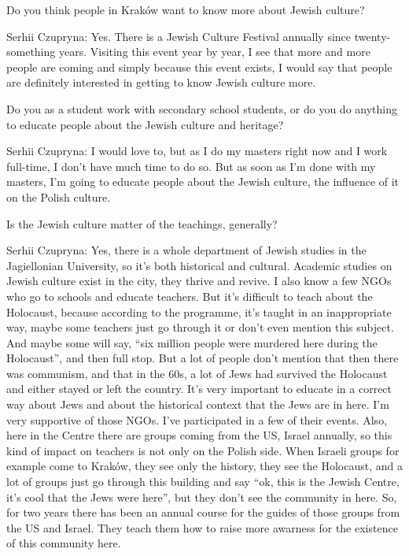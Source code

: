  Do you think people in Kraków want to know more about Jewish culture? 

Serhii Czupryna: Yes. There is a Jewish Culture Festival annually since twenty-something years. Visiting this event year by year, I see that more and more people are coming and simply because this event exists, I would say that people are definitely interested in getting to know Jewish culture more.  

Do you as a student work with secondary school students, or do you do anything to educate people about the Jewish culture and heritage? 

Serhii Czupryna: I would love to, but as I do my masters right now and I work full-time, I don’t have much time to do so. But as soon as I’m done with my masters, I’m going to educate people about the Jewish culture, the influence of it on the Polish culture. 

Is the Jewish culture matter of the teachings, generally? 

Serhii Czupryna: Yes, there is a whole department of Jewish studies in the Jagiellonian University, so it’s both historical and cultural. Academic studies on Jewish culture exist in the city, they thrive and revive.  
I also know a few NGOs who go to schools and educate teachers. But it’s difficult to teach about the Holocaust, because according to the programme, it’s taught in an inappropriate way, maybe some teachers just go through it or don’t even mention this subject. And maybe some will say, “six million people were murdered here during the Holocaust”, and then full stop. But a lot of people don’t mention that then there was communism, and that in the 60s, a lot of Jews had survived the Holocaust and either stayed or left the country. It’s very important to educate in a correct way about Jews and about the historical context that the Jews are in here. I’m very supportive of those NGOs. I’ve participated in a few of their events.  
Also, here in the Centre there are groups coming from the US, Israel annually, so this kind of impact on teachers is not only on the Polish side. When Israeli groups for example come to Kraków, they see only the history, they see the Holocaust, and a lot of groups just go through this building and say “ok, this is the Jewish Centre, it’s cool that the Jews were here”, but they don’t see the community in here. So, for two years there has been an annual course for the guides of those groups from the US and Israel. They teach them how to raise more awarness for the existence of this community here.  

